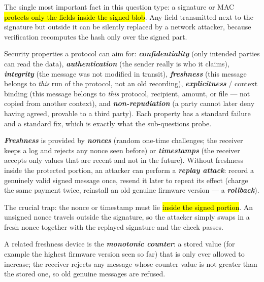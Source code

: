 \documentclass[12pt, a4paper]{article}
\newcommand{\term}[1]{\textbf{\textit{#1}}}        %
\newcommand{\imp}[1]{\hl{#1}}                       %
\begin{document}
The single most important fact in this question type: a signature or MAC \imp{protects only the fields inside the signed blob}. Any field transmitted next to the signature but outside it can be silently replaced by a network attacker, because verification recomputes the hash only over the signed part.

Security properties a protocol can aim for: \term{confidentiality} (only intended parties can read the data), \term{authentication} (the sender really is who it claims), \term{integrity} (the message was not modified in transit), \term{freshness} (this message belongs to \emph{this} run of the protocol, not an old recording), \term{explicitness} / context binding (this message belongs to \emph{this} protocol, recipient, amount, or file --- not copied from another context), and \term{non-repudiation} (a party cannot later deny having agreed, provable to a third party).
Each property has a standard failure and a standard fix, which is exactly what the sub-questions probe.

\term{Freshness} is provided by \term{nonces} (random one-time challenges; the receiver keeps a log and rejects any nonce seen before) or \term{timestamps} (the receiver accepts only values that are recent and not in the future).
Without freshness inside the protected portion, an attacker can perform a \term{replay attack}: record a genuinely valid signed message once, resend it later to repeat its effect (charge the same payment twice, reinstall an old genuine firmware version --- a \term{rollback}).

The crucial trap: the nonce or timestamp must lie \imp{inside the signed portion}. An unsigned nonce travels outside the signature, so the attacker simply swaps in a fresh nonce together with the replayed signature and the check passes.

A related freshness device is the \term{monotonic counter}: a stored value (for example the highest firmware version seen so far) that is only ever allowed to increase; the receiver rejects any message whose counter value is not greater than the stored one, so old genuine messages are refused.
\end{document}
